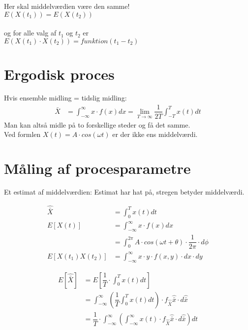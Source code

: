 \documentclass[Main]{subfiles}
\begin{document}
\begin{theo}
Her skal middelværdien være den samme! 
\\
$E(X(t_1)) = E(X(t_2))$ 
\\\\
og for alle valg af $t_1$ og $t_2$ er 
\\
$ E(X(t_1) \cdot X(t_2)) = funktion(t_1-t_2)$

\end{theo}




\section{Ergodisk proces} %
\label{sec:ergodisk_proces}

Hvis ensemble midling = tidslig midling:
\begin{align*}
\bar{X} &= \int_{-\infty}^\infty x \cdot f(x) dx = \lim\limits_{T \to \infty} \dfrac{1}{2T} \int_{-T}^T x(t) dt
\end{align*}
Man kan altså midle på to forskellige steder og få det samme.
\\
Ved formlen $X(t) = A \cdot cos(\omega t)$ er der ikke ens middelværdi.




\section{Måling af procesparametre} %
\label{sec:måling_af_procesparametre}


Et estimat af middelværdien:
Estimat har hat på, stregen betyder middelværdi.

\begin{align*}
\hat{\bar{X}} &= \int_0^T x(t) dt \\
E[ X(t) ] &= \int_{-\infty}^\infty x \cdot f(x) dx  \\
	&= \int_0^{2 \pi} A \cdot cos(\omega t + \theta) \cdot \dfrac{1}{2 \pi} \cdot d\phi \\
E [ X(t_1) X(t_2)] &= \int_{-\infty}^{\infty} x \cdot y \cdot f(x,y) \cdot dx \cdot dy
\end{align*}

\begin{align*}
E[\hat{\bar{X}} ] &= E[ \dfrac{1}{T} \cdot \int_0^T x(t) dt] \\
	&= \int_{-\infty}^\infty (\dfrac{1}{T} \int_0^T x(t) dt) \cdot f_{\hat{\bar{X}}}{\hat{\bar{x}}} \cdot d{\hat{\bar{x}}} \\
	&= \dfrac{1}{T} \cdot \int_{-\infty}^\infty (\int_{-\infty}^\infty x(t)  \cdot f_{\hat{\bar{X}}}{\hat{\bar{x}}} \cdot d{\hat{\bar{x}}} ) dt \\
\end{align*}
\end{document}
